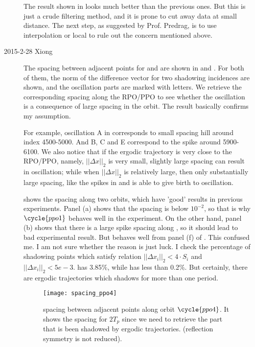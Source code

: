 \begin{description}
The result shown in 
  looks much better than the previous
ones. But this is just a crude filtering method, and it is prone to cut
away data at small distance. The next step, as suggested by Prof.
Predrag, is to use interpolation or local {\PoincSec} to rule out the
concern mentioned above.


\item[2015-2-28 Xiong]
  The spacing between adjacent points for  and
   are shown in  and
  . For both of them, the norm of the difference
  vector for two shadowing incidences
  are shown, and the oscillation parts are marked with letters.
  We retrieve the corresponding spacing along the RPO/PPO to see whether
  the oscillation is a consequence of large spacing in the orbit.
  The result basically confirms my assumption.

  For example, oscillation A in  corresponds
  to small spacing hill around index 4500-5000. And B, C and E
  correspond to the spike around 5900-6100.
  We also notice that if the ergodic trajectory is very close to
  the RPO/PPO, namely, $||\Delta x||_2$ is very small, slightly
  large spacing can result in oscillation; while when
  $||\Delta x||_2$ is relatively large, then only substantially large
  spacing, like the spikes in  and
   is able to give birth to oscillation.

   shows the spacing along two orbits,
  which have 'good' results in previous experiments. Panel (a) shows
  that the spacing is below $10^{-2}$, so that is why $\cycle{ppo1}$
  behaves well in the experiment. On the other hand, panel (b) shows
  that there is a large spike spacing along , so it
  should lead to bad experimental result. But  behaves
  well from panel (f) of . This
  confused me. I am not sure whether the reason is just luck.
  I check the percentage of shadowing points which satisfy
  relation $||\Delta x_i||_2 < 4 \cdot S_i$ and $||\Delta x_i||_2 < 5e-3$.
   has 3.85\%, while  has less than 0.2\%.
  But certainly, there are ergodic trajectories which shadows 
  for more than one period.

  \begin{figure}[h]
    \centering
    \texttt{[image: spacing\_ppo4]}
    \caption{
      spacing between adjacent points along orbit $\cycle{ppo4}$.
      It shows the spacing for $2T_p$ since we need to retrieve the part
      that is been shadowed by ergodic trajectories. (reflection symmetry
      is not reduced).
    }
    \label{fig:spacing_ppo4}
  \end{figure}


\end{description}
